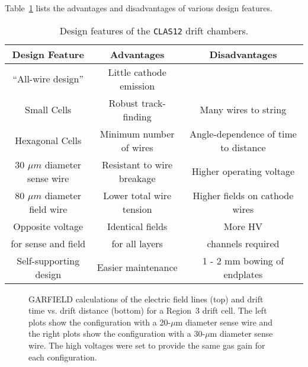 Table~\ref{fwd-dc-design-features} lists the advantages and disadvantages
of various design features.
\begin{table}[ht]
\begin{center}
\begin{tabular} {||c|c|c||} \hline \hline
{\bf Design Feature  }       &{\bf Advantages} &{\bf Disadvantages}\\ \hline
``All-wire design'' & Little cathode emission & \\ \hline
Small Cells & Robust track-finding  & Many wires to string \\ \hline
Hexagonal Cells & Minimum number of wires  & Angle-dependence of time to distance  \\ \hline
30 $\mu m$ diameter sense wire & Resistant to wire breakage & Higher operating voltage \\ \hline
80 $\mu m$ diameter field wire & Lower total wire tension & Higher fields on cathode wires \\ \hline
Opposite voltage  & Identical fields & More HV \\
for sense and field & for all layers & channels required \\ \hline
Self-supporting design & Easier maintenance & 1 - 2 mm bowing of endplates \\ \hline
\end{tabular}
\caption{\small{Design features of the {\tt CLAS12} drift chambers.}}
\label{fwd-dc-design-features}
\end{center}
\end{table}

\begin{figure}[htbp]
\vspace{10.0cm}
\caption{\small{GARFIELD calculations of the electric field lines (top)
and drift time vs. drift distance (bottom) for a Region~3 drift cell.  The 
left plots show the configuration with a 20-$\mu$m diameter sense wire and 
the right plots show the configuration with a 30-$\mu$m diameter sense wire.
The high voltages were set to provide the same gas gain for each
configuration.}}
\label{garfield-20-vs-30-micron}
\end{figure}


